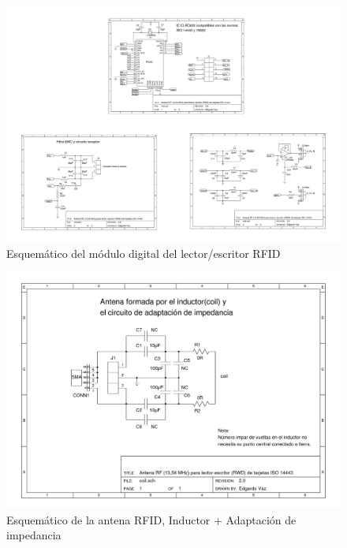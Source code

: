 \begin{figure}[H]
\centering
  \begin{center}
  \includegraphics[angle=90]{Imagenes/rfid_rwd.jpg}
  \end{center}
  \caption{Esquemático del módulo digital del lector/escritor RFID}\label{Fig:HW} 
\end{figure}

\begin{figure}[H]
\centering
  \begin{center}
  \includegraphics[angle=90]{Imagenes/rfid_coil.jpg}
  \end{center}
  \caption{Esquemático de la antena RFID, Inductor + Adaptación de impedancia}\label{Fig:HW} 
\end{figure}

